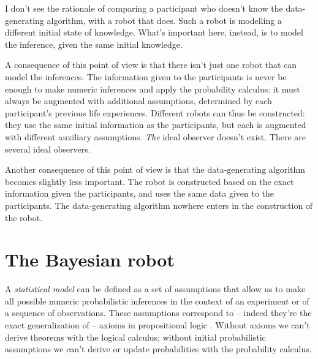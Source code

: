 \documentclass[\ifafour a4paper,12pt,\else a5paper,10pt,\fi%
onecolumn,oneside,article,%
british%
]{memoir}
\theoremstyle{remark}
\theoremstyle{innote}
\newcommand*{\citep}{\parencites}
\renewcommand*{\|}{\mathpunct{|}}
\newcommand*{\chap}{ch.}%
\newcommand*{\cf}{{cf.}}
\begin{document}
I don't see the rationale of comparing a participant who doesn't know the
data-generating algorithm, with a robot that does. Such a robot is
modelling a different initial state of knowledge. What's important here,
instead, is to model the inference, given the same initial knowledge.

A consequence of this point of view is that there isn't just one robot that
can model the inferences. The information given to the participants is
never be enough to make numeric inferences and apply the probability
calculus: it must always be augmented with additional assumptions,
determined by each participant's previous life experiences. Different
robots can thus be constructed: they use the same initial information as
the participants, but each is augmented with different auxiliary
assumptions. \emph{The} ideal observer doesn't exist. There are several
ideal observers.

Another consequence of this point of view is that the data-generating
algorithm becomes slightly less important. The robot is constructed based
on the exact information given the participants, and uses the same data
given to the participants. The data-generating algorithm nowhere enters in
the construction of the robot.

\section{The Bayesian robot}
\label{sec:bayesian_robot}

A \emph{statistical model} can be defined as a set of assumptions that
allow us to make all possible numeric probabilistic inferences in the
context of an experiment or of a sequence of observations. These
assumptions correspond to -- indeed they're the exact generalization of --
axioms in propositional logic
\citep{hailperin1996,hailperin2011,jaynes1994_r2003}. Without axioms we
can't derive theorems with the logical calculus; without initial
probabilistic assumptions we can't derive or update probabilities with the
probability calculus.
\end{document}
